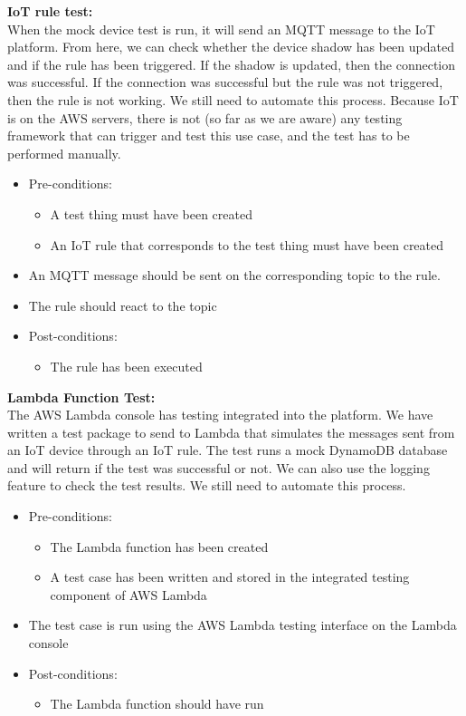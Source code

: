 \documentclass{article}
\begin{document}
				\textbf{IoT rule test:}
				\\
				When the mock device test is run, it will send an MQTT message to the IoT platform. From here, we can check whether the device shadow has been updated and if the rule has been triggered. If the shadow is updated, then the connection was successful. If the connection was successful but the rule was not triggered, then the rule is not working. We still need to automate this process. Because IoT is on the AWS servers, there is not (so far as we are aware) any testing framework that can trigger and test this use case, and the test has to be performed manually.
				\begin{itemize}
					\item Pre-conditions:
					\begin{itemize}
						\item A test thing must have been created
						\item An IoT rule that corresponds to the test thing must have been created
					\end{itemize}
					\item An MQTT message should be sent on the corresponding topic to the rule.
					\item The rule should react to the topic
					\item Post-conditions:
					\begin{itemize}
						\item The rule has been executed
					\end{itemize}
				\end{itemize}
				
				\textbf{Lambda Function Test:}
				\\
				The AWS Lambda console has testing integrated into the platform. We have written a test package to send to Lambda that simulates the messages sent from an IoT device through an IoT rule. The test runs a mock DynamoDB database and will return if the test was successful or not. We can also use the logging feature to check the test results. We still need to automate this process.
				\begin{itemize}
					\item Pre-conditions:
					\begin{itemize}
						\item The Lambda function has been created
						\item A test case has been written and stored in the integrated testing component of AWS Lambda
					\end{itemize}
					\item The test case is run using the AWS Lambda testing interface on the Lambda console
					\item Post-conditions:
					\begin{itemize}
						\item The Lambda function should have run
					\end{itemize}
				\end{itemize}
				
\end{document}

